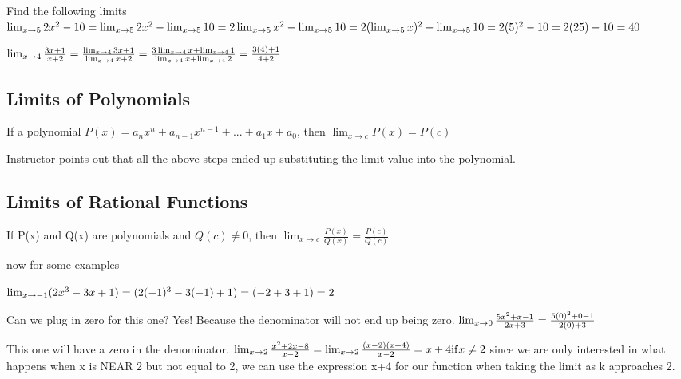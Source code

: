 \documentclass[12pt]{article}
\begin{document}
Find the following limits
$\lim_{x \to 5}2x^2 - 10\\
=\lim_{x \to 5}2x^2 - \lim_{x \to 5}10\\
=2\lim_{x \to 5}x^2 - \lim_{x \to 5}10\\
=2(\lim_{x \to 5}x)^2 - \lim_{x \to 5}10\\
=2(5)^2 - 10\\
=2(25) - 10\\
= 40$

$\lim_{x \to 4}\frac{3x+1}{x+2}\\
=\frac{\lim_{x \to 4}3x+1}{\lim_{x \to 4}x+2}\\
=\frac{3\lim_{x \to 4}x+\lim_{x \to 4}1}{\lim_{x \to 4}x+\lim_{x \to 4}2}\\
=\frac{3(4)+1}{4+2}
$

\subsection{Limits of Polynomials}
If a polynomial $P(x) = a_n x^n + a_{n-1}x^{n-1}+ ... + a_1x + a_0$, then $\lim_{x \to c} P(x)= P(c)$

Instructor points out that all the above steps ended up substituting the limit value into the polynomial.

\subsection{Limits of Rational Functions}
If P(x) and Q(x) are polynomials and $Q(c) \neq 0$, then $\lim_{x \to c}\frac{P(x)}{Q(x)} = \frac{P(c)}{Q(c)}$

now for some examples

$\lim_{x \to -1}(2x^3 - 3x + 1)\\
= (2(-1)^3 - 3(-1) + 1)\\
= (-2 + 3 + 1)\\
= 2$

Can we plug in zero for this one? Yes! Because the denominator will not end up being zero.
$\lim_{x \to 0}\frac{5x^2 + x - 1}{2x + 3}\\
=\frac{5(0)^2 + 0 - 1}{2(0) + 3}
$

This one will have a zero in the denominator.
$\lim_{x \to 2}\frac{x^2 +2x-8}{x-2}\\
=\lim_{x \to 2}\frac{(x-2)(x+4)}{x-2} = x+4 \mathrm{if}  x \neq 2$
since we are only interested in what happens when x is NEAR 2 but not equal to 2, we can use the expression
x+4 for our function when taking the limit as k approaches 2.
\end{document}
